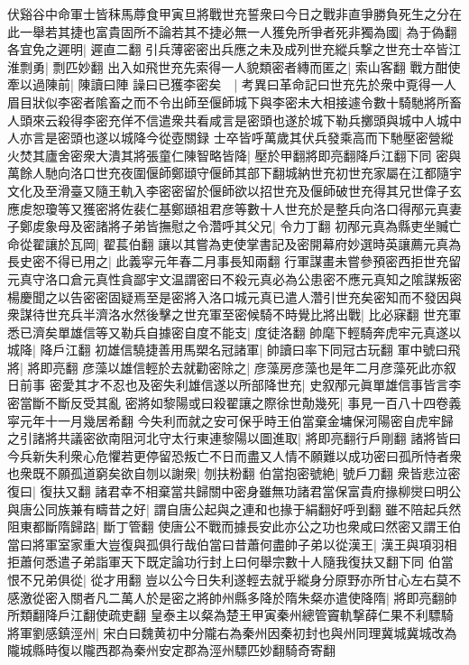 伏谿谷中命軍士皆秣馬蓐食甲寅旦將戰世充誓衆曰今日之戰非直爭勝負死生之分在此一舉若其捷也富貴固所不論若其不捷必無一人獲免所爭者死非獨為國|{
	為于偽翻}
各宜免之遲明|{
	遲直二翻}
引兵薄密密出兵應之未及成列世充縱兵撃之世充士卒皆江淮剽勇|{
	剽匹妙翻}
出入如飛世充先索得一人貌類密者縳而匿之|{
	索山客翻}
戰方酣使牽以過陳前|{
	陳讀曰陣}
譟曰已獲李密矣　|{
	考異曰革命記曰世充先於衆中覔得一人眉目狀似李密者隂畜之而不令出師至偃師城下與李密未大相接遽令數十騎馳將所畜人頭來云殺得李密充佯不信遣衆共看咸言是密頭也遂於城下勒兵擲頭與城中人城中人亦言是密頭也遂以城降今從壺關録}
士卒皆呼萬歲其伏兵發乘高而下馳壓密營縱火焚其廬舍密衆大潰其將張童仁陳智略皆降|{
	壓於甲翻將即亮翻降戶江翻下同}
密與萬餘人馳向洛口世充夜圍偃師鄭頲守偃師其部下翻城納世充初世充家屬在江都隨宇文化及至滑臺又隨王軌入李密密留於偃師欲以招世充及偃師破世充得其兄世偉子玄應䖍恕瓊等又獲密將佐裴仁基鄭頲祖君彦等數十人世充於是整兵向洛口得邴元真妻子鄭䖍象母及密諸將子弟皆撫慰之令濳呼其父兄|{
	令力丁翻}
初邴元真為縣吏坐贓亡命從翟讓於瓦岡|{
	翟萇伯翻}
讓以其嘗為吏使掌書記及密開幕府妙選時英讓薦元真為長史密不得已用之|{
	此義寜元年春二月事長知兩翻}
行軍謀畫未嘗參預密西拒世充留元真守洛口倉元真性貪鄙宇文温謂密曰不殺元真必為公患密不應元真知之隂謀叛密楊慶聞之以告密密固疑焉至是密將入洛口城元真已遣人濳引世充矣密知而不發因與衆謀待世充兵半濟洛水然後擊之世充軍至密候騎不時覺比將出戰|{
	比必寐翻}
世充軍悉已濟矣單雄信等又勒兵自據密自度不能支|{
	度徒洛翻}
帥麾下輕騎奔虎牢元真遂以城降|{
	降戶江翻}
初雄信驍捷善用馬槊名冠諸軍|{
	帥讀曰率下同冠古玩翻}
軍中號曰飛將|{
	將即亮翻}
彦藻以雄信輕於去就勸密除之|{
	彦藻房彦藻也是年二月彦藻死此亦叙日前事}
密愛其才不忍也及密失利雄信遂以所部降世充|{
	史叙邴元眞單雄信事皆言李密當斷不斷反受其亂}
密將如黎陽或曰殺翟讓之際徐世勣幾死|{
	事見一百八十四卷義寜元年十一月幾居希翻}
今失利而就之安可保乎時王伯當棄金墉保河陽密自虎牢歸之引諸將共議密欲南阻河北守太行東連黎陽以圖進取|{
	將即亮翻行戶剛翻}
諸將皆曰今兵新失利衆心危懼若更停留恐叛亡不日而盡又人情不願難以成功密曰孤所恃者衆也衆既不願孤道窮矣欲自刎以謝衆|{
	刎扶粉翻}
伯當抱密號絶|{
	號戶刀翻}
衆皆悲泣密復曰|{
	復扶又翻}
諸君幸不相棄當共歸關中密身雖無功諸君當保富貴府掾柳爕曰明公與唐公同族兼有疇昔之好|{
	謂自唐公起與之連和也掾于絹翻好呼到翻}
雖不陪起兵然阻東都斷隋歸路|{
	斷丁管翻}
使唐公不戰而據長安此亦公之功也衆咸曰然密又謂王伯當曰將軍室家重大豈復與孤俱行哉伯當曰昔蕭何盡帥子弟以從漢王|{
	漢王與項羽相拒蕭何悉遣子弟詣軍天下既定論功行封上曰何舉宗數十人隨我復扶又翻下同}
伯當恨不兄弟俱從|{
	從才用翻}
豈以公今日失利遂輕去就乎縱身分原野亦所甘心左右莫不感激從密入關者凡二萬人於是密之將帥州縣多降於隋朱粲亦遣使降隋|{
	將即亮翻帥所類翻降戶江翻使疏吏翻}
皇泰主以粲為楚王甲寅秦州總管竇軌撃薛仁果不利驃騎將軍劉感鎮涇州|{
	宋白曰魏黄初中分隴右為秦州因秦初封也與州同理冀城冀城改為隴城縣時復以隴西郡為秦州安定郡為涇州驃匹妙翻騎奇寄翻}
